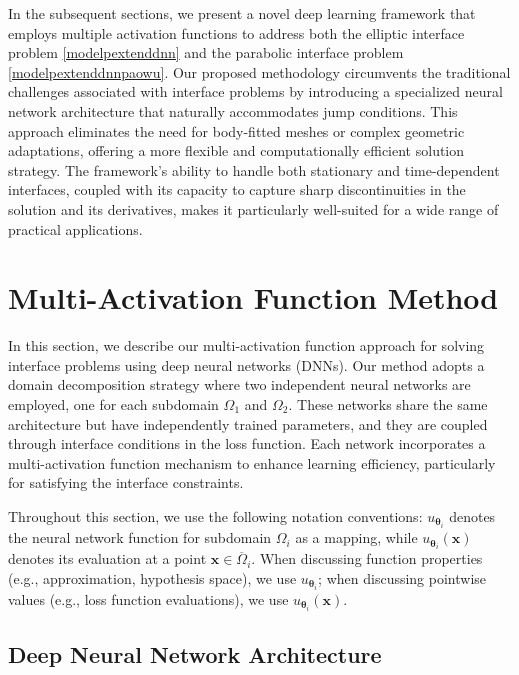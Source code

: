 \documentclass{article}
\begin{document}
In the subsequent sections, we present a novel deep learning framework that employs multiple activation functions to address both the elliptic interface problem \eqref{modelpextenddnn} and the parabolic interface problem \eqref{modelpextenddnnpaowu}. Our proposed methodology circumvents the traditional challenges associated with interface problems by introducing a specialized neural network architecture that naturally accommodates jump conditions. This approach eliminates the need for body-fitted meshes or complex geometric adaptations, offering a more flexible and computationally efficient solution strategy. The framework's ability to handle both stationary and time-dependent interfaces, coupled with its capacity to capture sharp discontinuities in the solution and its derivatives, makes it particularly well-suited for a wide range of practical applications.


\section{Multi-Activation Function Method}
\label{Multi-ActivationFunction}

In this section, we describe our multi-activation function approach for solving interface problems using deep neural networks (DNNs). Our method adopts a domain decomposition strategy where two independent neural networks are employed, one for each subdomain $\Omega_1$ and $\Omega_2$. These networks share the same architecture but have independently trained parameters, and they are coupled through interface conditions in the loss function. Each network incorporates a multi-activation function mechanism to enhance learning efficiency, particularly for satisfying the interface constraints.

Throughout this section, we use the following notation conventions: $u_{\boldsymbol{\theta}_i}$ denotes the neural network function for subdomain $\Omega_i$ as a mapping, while $u_{\boldsymbol{\theta}_i}(\boldsymbol{x})$ denotes its evaluation at a point $\boldsymbol{x} \in \overline{\Omega}_i$. When discussing function properties (e.g., approximation, hypothesis space), we use $u_{\boldsymbol{\theta}_i}$; when discussing pointwise values (e.g., loss function evaluations), we use $u_{\boldsymbol{\theta}_i}(\boldsymbol{x})$.

\subsection{Deep Neural Network Architecture}
\end{document}
